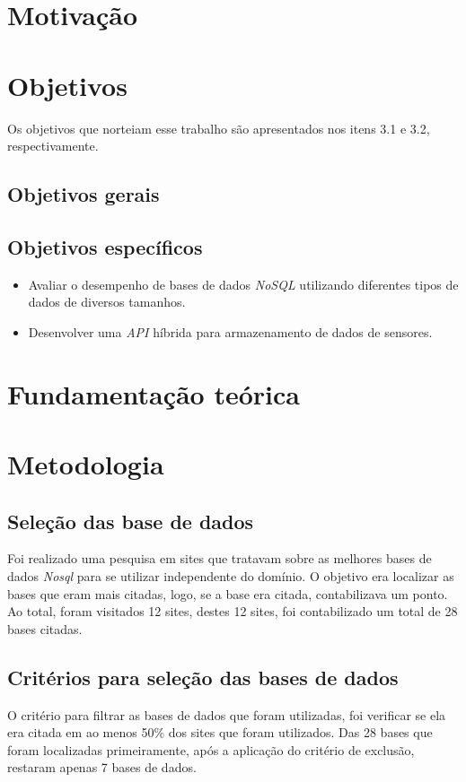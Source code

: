 \documentclass[12pt]{article}
\begin{document}
\section{Motivação} \label{sec:Motivação}


\section{Objetivos}
Os objetivos que norteiam esse trabalho são apresentados nos itens  3.1 e 3.2, respectivamente.


\subsection{Objetivos gerais}

\subsection{Objetivos específicos}
\begin{itemize}
   \item Avaliar o desempenho de bases de dados \textit{NoSQL} utilizando diferentes tipos de dados de diversos tamanhos.
   \item Desenvolver uma \textit{API} híbrida para armazenamento de dados de sensores.
 \end{itemize}



\section{Fundamentação teórica}


\section{Metodologia}
\subsection{Seleção das base de dados}
Foi realizado uma pesquisa em sites que tratavam sobre as melhores bases de dados \textit{Nosql} para se utilizar independente do domínio. O objetivo era localizar as bases que eram mais citadas, logo, se a base era citada, contabilizava um ponto. Ao total, foram visitados 12 sites, destes 12 sites, foi contabilizado um total de 28 bases citadas. 
\subsection{Critérios para seleção das bases de dados}
O critério para filtrar as bases de dados que foram utilizadas, foi verificar se ela era citada em ao menos 50\% dos sites que foram utilizados.  Das 28 bases que foram localizadas primeiramente, após a aplicação do critério de exclusão, restaram apenas 7 bases de dados.
\end{document}
